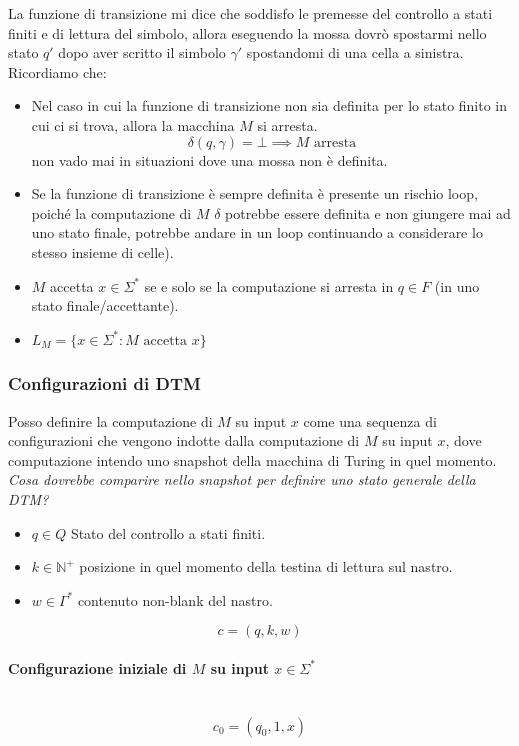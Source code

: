 \documentclass{article}
\begin{document}
La funzione di transizione mi dice che soddisfo le premesse del controllo a stati finiti
e di lettura del simbolo, allora eseguendo la mossa dovrò spostarmi nello stato $q'$
dopo aver scritto il simbolo $\gamma'$ spostandomi di una cella a sinistra.
Ricordiamo che:
\begin{itemize}
    \item Nel caso in cui la funzione di transizione non sia definita per lo stato
          finito in cui ci si trova, allora la macchina $M$ si arresta.
          $$\delta(q,\gamma)=\bot\implies M\text{ arresta}$$
          non vado mai in situazioni dove una mossa non è definita.
    \item Se la funzione di transizione è sempre definita è presente un
          rischio loop, poiché la computazione
          di $M$ $\delta$ potrebbe essere definita e non giungere mai ad uno stato finale, potrebbe
          andare in un loop continuando a considerare lo stesso insieme di celle).
    \item $M$ accetta $x\in\Sigma^*$ se e solo se la computazione si arresta
          in $q\in F$ (in uno stato finale/accettante).
    \item $L_M=\{x\in\Sigma^*:M\text{ accetta }x\}$
\end{itemize}

\subsubsection{Configurazioni di DTM}
Posso definire la computazione di $M$ su input $x$ come una sequenza di configurazioni
che vengono indotte dalla computazione di $M$ su input $x$, dove computazione intendo
uno snapshot della macchina di Turing in quel momento. \textit{Cosa dovrebbe comparire
    nello snapshot per definire uno stato generale della DTM?}
\begin{itemize}
    \item $q\in Q$ Stato del controllo a stati finiti.
    \item $k\in\mathbb{N}^+$ posizione in quel momento della testina di lettura sul nastro.
    \item $w\in\Gamma^*$ contenuto non-blank del nastro.
\end{itemize}
$$c=(q,k,w)$$
\paragraph{Configurazione iniziale di $M$ su input $x\in\Sigma^*$}\mbox{}\\
$$c_0=(q_0,1,x)$$
\end{document}

